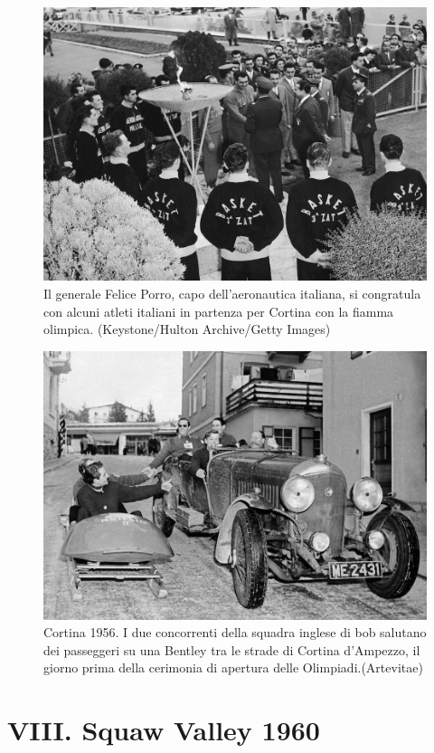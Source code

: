 \documentclass[
]{book}
\begin{document}
\begin{figure}
\includegraphics[width=0.8\linewidth]{images/IlPost/1956(2)} \caption{Il generale Felice Porro, capo dell'aeronautica italiana, si congratula con alcuni atleti italiani in partenza per Cortina con la fiamma olimpica. (Keystone/Hulton Archive/Getty Images)}\label{fig:unnamed-chunk-20}
\end{figure}

\begin{figure}
\includegraphics[width=0.8\linewidth]{images/ArteVitae/1956} \caption{Cortina 1956. I due concorrenti della squadra inglese di bob salutano dei passeggeri su una Bentley tra le strade di Cortina d’Ampezzo, il giorno prima della cerimonia di apertura delle Olimpiadi.(Artevitae)}\label{fig:unnamed-chunk-21}
\end{figure}

\chapter*{VIII. Squaw Valley 1960}\label{viii.-squaw-valley-1960}
\end{document}
